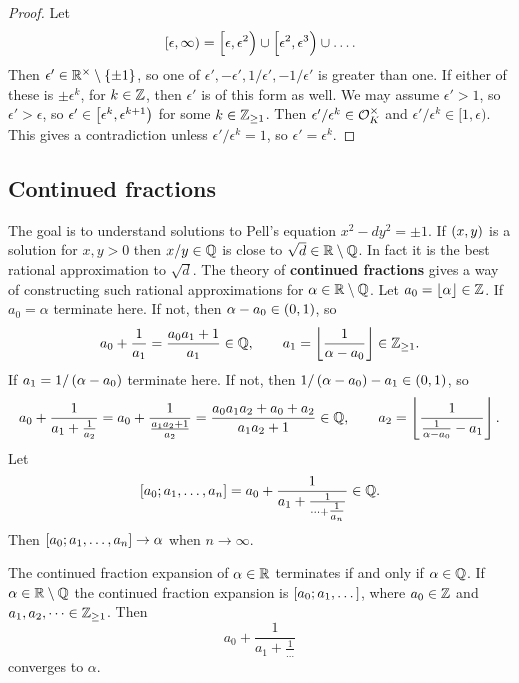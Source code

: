 \begin{proof}
Let
$$ \intco{\epsilon, \infty} = \intco{\epsilon, \epsilon^2} \cup \intco{\epsilon^2, \epsilon^3} \cup \dots. $$
Then $ \epsilon' \in \R^\times \setminus \cbr{\pm 1} $, so one of $ \epsilon', -\epsilon', 1 / \epsilon', -1 / \epsilon' $ is greater than one. If either of these is $ \pm\epsilon^k $, for $ k \in \mathbb{Z} $, then $ \epsilon' $ is of this form as well. We may assume $ \epsilon' > 1 $, so $ \epsilon' > \epsilon $, so $ \epsilon' \in \intco{\epsilon^k, \epsilon^{k + 1}} $ for some $ k \in \mathbb{Z}_{\ge 1} $. Then $ \epsilon' / \epsilon^k \in \mathcal{O}_K^\times $ and $ \epsilon' / \epsilon^k \in [1, \epsilon) $. This gives a contradiction unless $ \epsilon' / \epsilon^k = 1 $, so $ \epsilon' = \epsilon^k $.
\end{proof}

\subsection{Continued fractions}

The goal is to understand solutions to Pell's equation $ x^2 - dy^2 = \pm 1 $. If $ \br{x, y} $ is a solution for $ x, y > 0 $ then $ x / y \in \mathbb{Q} $ is close to $ \sqrt{d} \in \mathbb{R} \setminus \mathbb{Q} $. In fact it is the best rational approximation to $ \sqrt{d} $. The theory of \textbf{continued fractions} gives a way of constructing such rational approximations for $ \alpha \in \mathbb{R} \setminus \mathbb{Q} $. Let $ a_0 = \left\lfloor \alpha \right\rfloor \in \mathbb{Z} $. If $ a_0 = \alpha $ terminate here. If not, then $ \alpha - a_0 \in \br{0, 1} $, so
$$ a_0 + \dfrac{1}{a_1} = \dfrac{a_0a_1 + 1}{a_1} \in \mathbb{Q}, \qquad a_1 = \left\lfloor \dfrac{1}{\alpha - a_0} \right\rfloor \in \mathbb{Z}_{\ge 1}. $$
If $ a_1 = 1 / \br{\alpha - a_0} $ terminate here. If not, then $ 1 / \br{\alpha - a_0} - a_1 \in \br{0, 1} $, so
$$ a_0 + \dfrac{1}{a_1 + \tfrac{1}{a_2}} = a_0 + \dfrac{1}{\tfrac{a_1a_2 + 1}{a_2}} = \dfrac{a_0a_1a_2 + a_0 + a_2}{a_1a_2 + 1} \in \mathbb{Q}, \qquad a_2 = \left\lfloor \dfrac{1}{\tfrac{1}{\alpha - a_0} - a_1} \right\rfloor. $$
Let
$$ \sbr{a_0; a_1, \dots, a_n} = a_0 + \dfrac{1}{a_1 + \tfrac{1}{\dots + \tfrac{1}{a_n}}} \in \Q. $$
Then $ \sbr{a_0; a_1, \dots, a_n} \to \alpha $ when $ n \to \infty $.

\begin{lemma}
The continued fraction expansion of $ \alpha \in \mathbb{R} $ terminates if and only if $ \alpha \in \mathbb{Q} $. If $ \alpha \in \mathbb{R} \setminus \mathbb{Q} $ the continued fraction expansion is $ \sbr{a_0; a_1, \dots} $, where $ a_0 \in \mathbb{Z} $ and $ a_1, a_2, \dots \in \mathbb{Z}_{\ge 1} $. Then
$$ a_0 + \dfrac{1}{a_1 + \tfrac{1}{\dots}} $$
converges to $ \alpha $.
\end{lemma}

